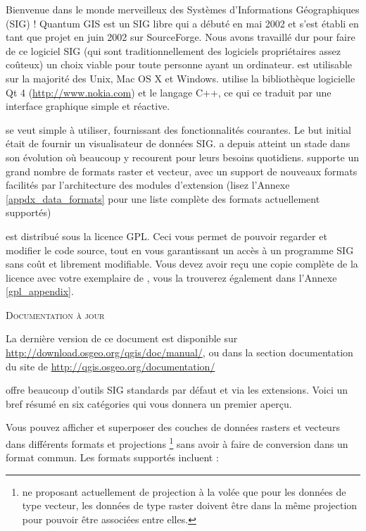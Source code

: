 \mainmatter
\pagestyle{scrheadings}
\label{label_forward}

Bienvenue dans le monde merveilleux des Systèmes d'Informations Géographiques (SIG) ! Quantum GIS est un SIG libre qui a débuté en mai 2002 et s'est établi en tant que projet en juin 2002 sur SourceForge. Nous avons travaillé dur pour faire de ce logiciel SIG (qui sont traditionnellement des logiciels propriétaires assez coûteux) un choix viable pour toute personne ayant un ordinateur. \qg est utilisable sur la majorité des Unix, Mac OS X et Windows. \qg utilise la bibliothèque logicielle Qt 4 (\url{http://www.nokia.com}) et le langage C++, ce qui ce traduit par une interface graphique simple et réactive.

\qg se veut simple à utiliser, fournissant des fonctionnalités courantes. Le but initial était de fournir un visualisateur de données SIG. \qg a depuis atteint un stade dans son évolution où beaucoup y recourent pour leurs besoins quotidiens. \qg supporte un grand nombre de formats raster et vecteur, avec un support de nouveaux formats facilités par l'architecture des modules d'extension (lisez l'Annexe \ref{appdx_data_formats} pour une liste complète des formats actuellement supportés)

\qg est distribué sous la licence GPL. Ceci vous permet de pouvoir regarder et modifier le code source, tout en vous garantissant un accès à un programme SIG sans coût et librement modifiable. Vous devez avoir reçu une copie complète de la licence avec votre exemplaire de \qg, vous la trouverez également dans l'Annexe \ref{gpl_appendix}.

\begin{Tip}\caption{\textsc{Documentation à jour}}
La dernière version de ce document est disponible sur \url{http://download.osgeo.org/qgis/doc/manual/}, ou dans la section documentation du site de \qg \url{http://qgis.osgeo.org/documentation/}
\end{Tip}

\label{label_majfeat}

\qg offre beaucoup d'outils SIG standards par défaut et via les extensions. Voici un bref résumé en six catégories qui vous donnera un premier aperçu.


Vous pouvez afficher et superposer des couches de données rasters et vecteurs dans différents formats et projections \footnote{\qg ne proposant actuellement de projection à la volée que pour les données de type vecteur, les données de type raster doivent être dans la même projection pour pouvoir être associées entre elles.} sans avoir à faire de conversion dans un format commun. Les formats supportés incluent :

